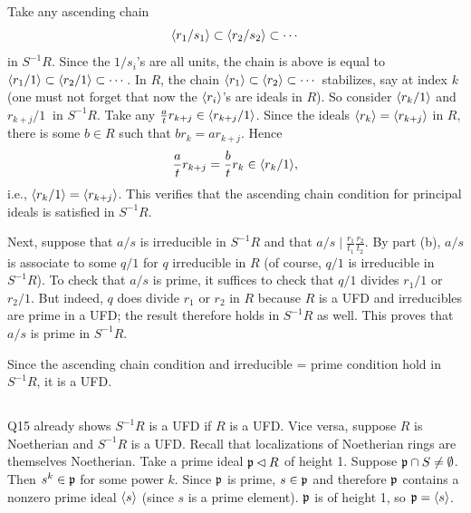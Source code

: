 \documentclass[12pt]{article}
\begin{document}
\subsubsection{} 
Take any ascending chain 
$$\langle r_1 / s_1\rangle \subset \langle r_2 / s_2\rangle \subset \cdots$$ 
in $S^{-1}R$. 
Since the $1 / s_i$'s are all units, the chain is above is equal to $\langle r_1 / 1\rangle \subset \langle r_2 / 1\rangle \subset \cdots$. 
In $R$, the chain $\langle r_1\rangle \subset \langle r_2\rangle \subset \cdots$ stabilizes, say at index $k$ (one must not forget that now the $\langle r_i\rangle$'s are ideals in $R$). 
So consider $\langle r_k / 1\rangle$ and $r_{k + j} / 1\>$ in $S^{-1}R$. 
Take any $\frac{a}{t}r_{k + j} \in \langle r_{k + j} / 1\rangle$. 
Since the ideals $\langle r_{k}\rangle = \langle r_{k + j}\rangle$ in $R$, there is some $b \in R$ such that $br_{k} = ar_{k + j}$. 
Hence 
$$\frac{a}{t}r_{k + j} = \frac{b}{t} r_k \in \langle r_k / 1\rangle,$$ 
i.e., $\langle r_{k} / 1\rangle = \langle r_{k + j}\rangle$. 
This verifies that the ascending chain condition for principal ideals is satisfied in $S^{-1}R$. 

Next, suppose that $a / s$ is irreducible in $S^{-1}R$ and that $a /s \mid \frac{r_1}{t_1} \frac{r_2}{t_2}$. 
By part (b), $a / s$ is associate to some $q / 1$ for $q$ irreducible in $R$ (of course, $q / 1$ is irreducible in $S^{-1}R$). 
To check that $a / s$ is prime, it suffices to check that $q / 1$ divides $r_1 / 1$ or $r_2 / 1$. 
But indeed, $q$ does divide $r_1$ or $r_2$ in $R$ because $R$ is a UFD and irreducibles are prime in a UFD; 
the result therefore holds in $S^{-1}R$ as well. 
This proves that $a / s$ is prime in $S^{-1}R$. 

Since the ascending chain condition and irreducible = prime condition hold in $S^{-1}R$, it is a UFD. 

\subsection{} 
Q15 already shows $S^{-1}R$ is a UFD if $R$ is a UFD. 
Vice versa, suppose $R$ is Noetherian and $S^{-1}R$ is a UFD. 
Recall that localizations of Noetherian rings are themselves Noetherian. 
Take a prime ideal $\mathfrak{p} \lhd R$ of height 1. 
Suppose $\mathfrak{p} \cap S \neq \emptyset$. 
Then $s^k \in \mathfrak{p}$ for some power $k$. 
Since $\mathfrak{p}$ is prime, $s \in \mathfrak{p}$ and therefore $\mathfrak{p}$ contains a nonzero prime ideal $\langle s\rangle$ (since $s$ is a prime element). 
$\mathfrak{p}$ is of height 1, so $\mathfrak{p} = \langle s\rangle$. 
\end{document}
